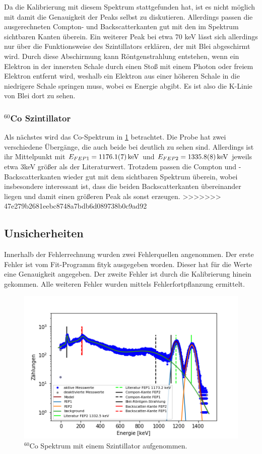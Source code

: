 Da die Kalibrierung mit diesem Spektrum stattgefunden hat, ist es nicht möglich mit  damit die Genauigkeit der Peaks selbst zu diskutieren. Allerdings passen die ausgerechneten Compton- und Backscatterkanten gut mit den im Spektrum sichtbaren Kanten überein. Ein weiterer Peak bei etwa 70 keV lässt sich allerdings nur über die Funktionsweise des Szintillators erklären, der mit Blei abgeschirmt wird. Durch diese Abschirmung kann Röntgenstrahlung entstehen, wenn ein Elektron in der innersten Schale durch einen Stoß mit einem Photon oder freiem Elektron entfernt wird, weshalb ein Elektron aus einer höheren Schale in die niedrigere Schale springen muss, wobei es Energie abgibt. Es ist also die K-Linie von Blei dort zu sehen.

\subsubsection{$^{60}$Co Szintillator}
Als nächstes wird das Co-Spektrum in \cref{co_sz} betrachtet. Die Probe hat zwei verschiedene Übergänge, die auch beide bei deutlich zu sehen sind. Allerdings ist ihr Mittelpunkt mit $E_{FEP1} = \SI{1176,1 \pm 0,7}{keV}$ und $E_{FEP2} = \SI{1335,8 \pm 0,8}{keV}$ jeweils etwa 3keV größer als der Literaturwert. Trotzdem passen die Compton und - Backscatterkanten wieder gut mit dem sichtbaren Spektrum überein, wobei insbesondere interessant ist, dass die beiden Backscatterkanten übereinander liegen und damit einen größeren Peak als sonst erzeugen.
>>>>>>> 47e279b2681eebc8748a7bdb6d089738b0c9ad92

\subsection{Unsicherheiten}
Innerhalb der Fehlerrechnung wurden zwei Fehlerquellen angenommen. Der erste Fehler ist vom Fit-Programm fityk ausgegeben worden. Dieser hat für die Werte eine Genauigkeit angegeben. Der zweite Fehler ist durch die Kalibrierung hinein gekommen. Alle weiteren Fehler wurden mittels Fehlerfortpflanzung ermittelt.

\begin{figure}[ht]
	\centering
	\includegraphics[scale=0.8]{co_sz_.png}
	\caption{$^{60}$Co Spektrum mit einem Szintillator aufgenommen.}
	\label{co_sz}
\end{figure}

